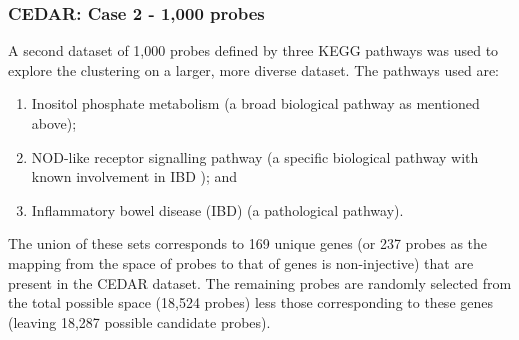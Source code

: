 \documentclass[12pt]{article} %
\begin{document}
	
	\subsubsection{CEDAR: Case 2 - 1,000 probes} \label{sec:case_studies:cedar:dataset_2}
	
	A second dataset of 1,000 probes defined by three KEGG pathways was used to explore the clustering on a larger, more diverse dataset. The pathways used are:
	
	\begin{enumerate} \label{list:kegg_pathways}
		\item Inositol phosphate metabolism (a broad biological pathway as mentioned above);
		\item NOD-like receptor signalling pathway (a specific biological pathway with known involvement in IBD \citep{CarneiroNodlikeproteinsinflammation2008, GarrettHomeostasisInflammationIntestine2010}); and
		\item Inflammatory bowel disease (IBD) (a pathological pathway).
	\end{enumerate}

	The union of these sets corresponds to 169 unique genes (or 237 probes as the mapping from the space of probes to that of genes is non-injective) that are present in the CEDAR dataset. The remaining probes are randomly selected from the total possible space (18,524 probes) less those corresponding to these genes (leaving 18,287 possible candidate probes).
\end{document}
